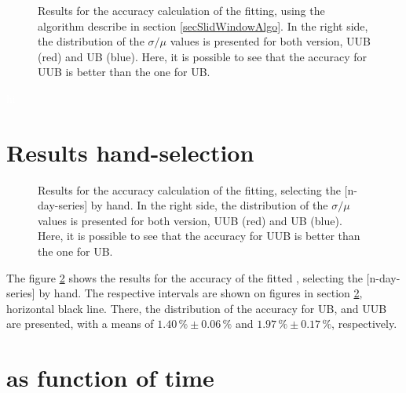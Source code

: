 \documentclass[twoside, final, 10pt]{articleMine}
\begin{document}
\begin{figure}[!t]
  \centering
  \caption{Results for the accuracy calculation of the \qpkvem
  fitting, using the algorithm describe in section 
  \ref{secSlidWindowAlgo}. In the right side, the distribution
  of the $\sigma/\mu$ values is presented for both version, UUB
  (red) and UB (blue). Here, it is possible to see that the
  accuracy for UUB is better than the one for UB.}
  \label{figAccuracyResults}
\end{figure}
\textcolor{white}{hi}
\clearpage


\section{Results hand-selection}
\begin{figure}[!t]
  \centering
  \caption{Results for the accuracy calculation of the \qpkvem
  fitting, selecting the [n-day-series] by hand. In the right
  side, the distribution of the $\sigma/\mu$ values is presented
  for both version, UUB (red) and UB (blue). Here, it is possible
  to see that the accuracy for UUB is better than the one for
  UB.}
  \label{figAccuracyResultsHand}
\end{figure}

The figure \ref{figAccuracyResultsHand} shows the results for the
accuracy of the fitted \qpkvem, selecting the [n-day-series] by
hand. The respective intervals are shown on figures in section
\ref{secQpkVsTime}, horizontal black line. There, the
distribution of the accuracy for UB, and UUB are presented, with
a means of $1.40\,\%\pm0.06\,\%$ and $1.97\,\%\pm0.17\,\%$,
respectively.
\clearpage




\section{\qpkvem as function of time}
\label{secQpkVsTime}
\end{document}
